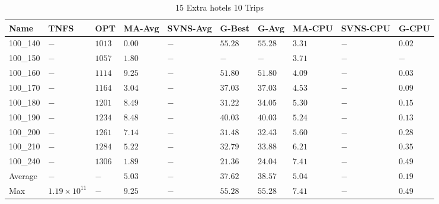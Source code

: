 \begin{center}
    \begin{table}[]
    \centering
    \begin{adjustwidth}{-0.4in}{-1in}
    \begin{tabular}{|lll|l|l|ll|lll|}
\hline
Name     & TNFS                & OPT    & MA-Avg & SVNS-Avg & G-Best & G-Avg & MA-CPU  & SVNS-CPU & G-CPU \\
\hline
100\_140  & $-                $ & $1013$ & $\bm{0.00}$ & $-$      & $55.28$& $55.28$   & $3.31$  & $-$      & $0.02$ \\
100\_150  & $-                $ & $1057$ & $1.80$ & $-$      & $-    $& $-    $   & $3.71$  & $-$      & $-   $ \\
100\_160  & $-                $ & $1114$ & $9.25$ & $-$      & $51.80$& $51.80$   & $4.09$  & $-$      & $0.03$ \\
100\_170  & $-                $ & $1164$ & $3.04$ & $-$      & $37.03$& $37.03$   & $4.53$  & $-$      & $0.09$ \\
100\_180  & $-                $ & $1201$ & $8.49$ & $-$      & $31.22$& $34.05$   & $5.30$  & $-$      & $0.15$ \\
100\_190  & $-                $ & $1234$ & $8.48$ & $-$      & $40.03$& $40.03$   & $5.24$  & $-$      & $0.13$ \\
100\_200  & $-                $ & $1261$ & $7.14$ & $-$      & $31.48$& $32.43$   & $5.60$  & $-$      & $0.28$ \\
100\_210  & $-                $ & $1284$ & $5.22$ & $-$      & $32.79$& $33.88$   & $6.21$  & $-$      & $0.35$ \\
100\_240  & $-                $ & $1306$ & $1.89$ & $-$      & $21.36$& $24.04$   & $7.41$  & $-$      & $0.49$ \\
\hline
Average  & $-                $ & $-   $ & $5.03$ & $-$      & $37.62$& $38.57$   & $5.04$  & $-$      & $0.19$ \\
Max      & $1.19\times10^{11}$ & $-   $ & $9.25$ & $-$      & $55.28$& $55.28$   & $7.41$  & $-$      & $0.49$ \\
\hline
\end{tabular}
    \end{adjustwidth}
    \caption{15 Extra hotels 10 Trips}
    \label{15-10}
    \end{table}
\end{center}
